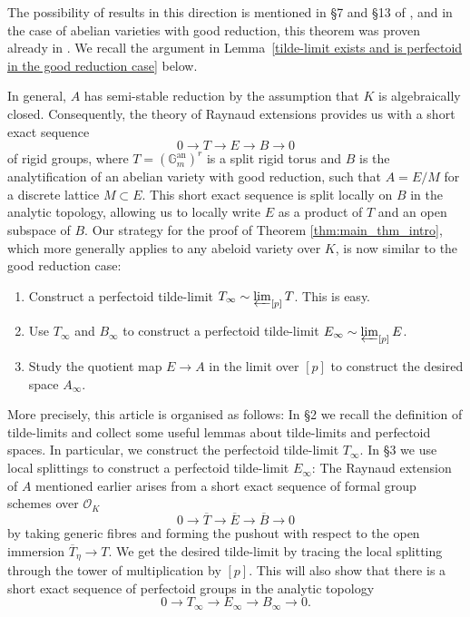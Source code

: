 \documentclass[10pt,oneside]{amsart}
\theoremstyle{definition}
\renewcommand{\O}{\mathcal{O}}
\begin{document}
The possibility of results in this direction is mentioned in \S 7 and \S 13 of \cite{scholzeICMproceedings}, and in the case of abelian varieties with good reduction, this theorem was proven already in \cite[Lemme~A.16]{Pilloni-Stroh}. We recall the argument in Lemma~\ref{tilde-limit exists and is perfectoid in the good reduction case} below. 

In general, $A$ has semi-stable reduction by the assumption that $K$ is algebraically closed.
Consequently, the theory of Raynaud extensions provides us with a short exact sequence 
\[ 0 \rightarrow T \rightarrow E  \rightarrow  B  \rightarrow  0\]
of rigid groups, where $T = (\mathbb G_m^{\text{an}})^{r}$ is a split rigid torus and $B$ is the analytification of an abelian variety with good reduction, such that $A = E/M$ for a discrete lattice $M \subset E$. This short exact sequence is split locally on $B$ in the analytic topology, allowing us to locally write $E$ as a product of $T$ and an open subspace of $B$.
Our strategy for the proof of Theorem \ref{thm:main_thm_intro}, which more generally applies to any abeloid variety over $K$, is now similar to the good reduction case:
\begin{enumerate}
\item Construct a perfectoid tilde-limit $T_\infty\sim\varprojlim_{[p]} T$. This is easy.
\item Use $T_\infty$ and $B_\infty$ to construct a perfectoid tilde-limit $E_\infty\sim\varprojlim_{[p]} E$.
\item Study the quotient map $E\rightarrow A$ in the limit over $[p]$ to construct the desired space $A_\infty$.
\end{enumerate}

More precisely, this article is organised as follows: In \S2 we recall the definition of tilde-limits and collect some useful lemmas about tilde-limits and perfectoid spaces. In particular, we construct the perfectoid tilde-limit $T_\infty$. In \S3 we use local splittings to construct a perfectoid tilde-limit $E_\infty$: The Raynaud extension of $A$ mentioned earlier arises from a short exact sequence of formal group schemes over $\O_K$
\[0\rightarrow \overline{T}\rightarrow \overline{E}\rightarrow \overline{B}\rightarrow 0\]
by taking generic fibres and forming the pushout with respect to the open immersion $\overline{T}_\eta\rightarrow T$. We get the desired tilde-limit by tracing the local splitting through the tower of multiplication by $[p]$. This will also show that there is a short exact sequence of perfectoid groups in the analytic topology
\[ 0\to T_\infty \to E_\infty \to B_\infty \to 0.\]
\end{document}
